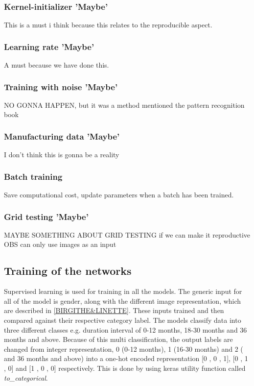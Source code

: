 \subsubsection{Kernel-initializer 'Maybe'}
This is a must i think because this relates to the reproducible aspect. 

\subsubsection{Learning rate 'Maybe'}
A must because we have done this. 

\subsubsection{Training with noise 'Maybe'}
NO GONNA HAPPEN, but it was a method mentioned the pattern recognition book

\subsubsection{Manufacturing data 'Maybe'}
I don't think this is gonna be a reality 

\subsubsection{Batch training}
Save computational cost, update parameters when a batch has been trained. 
 
\subsubsection{Grid testing 'Maybe'}
MAYBE SOMETHING ABOUT GRID TESTING if we can make it reproductive
OBS can only use images as an input

 
 
\subsection{Training of the networks}
Supervised learning is used for training in all the models. The generic input for all of the model is gender, along with the different image representation, which are described in \autoref{BIRGITHE&LINETTE}. These inputs trained and then compared against their respective category label.   
The models classify data into three different classes e.g. duration interval of 0-12 months, 18-30 months and 36 months and above. Because of this multi classification, the output labels are changed from integer representation, 0 (0-12 months), 1 (16-30 months) and 2 ( and 36 months and above) into a one-hot encoded representation [0 , 0 , 1], [0 , 1 , 0] and [1 , 0 , 0] respectively. This is done by using keras utility function called \textit{to_categorical}. 

